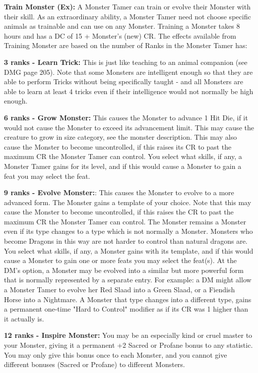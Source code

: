 \textbf{Train Monster (Ex):} A Monster Tamer can train or evolve their Monster with their  skill. As an extraordinary ability,
a Monster Tamer need not choose specific animals as trainable and can use  on any Monster. Training a Monster
takes 8 hours and has a DC of 15 + Monster's (new) CR. The effects available from Training Monster are based on the number of
Ranks in  the Monster Tamer has:

\begin{itemize*}
\item \textbf{3 ranks - Learn Trick:}  This is just like teaching to an animal companion (see DMG page 205). Note that some Monsters are intelligent enough so that they are able to perform Tricks without being specifically taught - and all Monsters are able to learn at least 4 tricks even if their intelligence would not normally be high enough.
\item \textbf{6 ranks - Grow Monster:} This causes the Monster to advance 1 Hit Die, if it would not cause the Monster to exceed its advancement limit. This may cause the creature to grow in size category, see the monster description. This may also cause the Monster to become uncontrolled, if this raises its CR to past the maximum CR the Monster Tamer can control. You select
what skills, if any, a Monster Tamer gains for its level, and if this would cause a Monster to gain a feat you may select the feat.
\item \textbf{9 ranks - Evolve Monster:}: This causes the Monster to evolve to a more advanced form. The Monster gains a template of your choice. Note that this may cause the Monster to become uncontrolled, if this raises the CR to past the maximum CR the Monster Tamer can control. The Monster remains a Monster even if its type changes to a type which is not normally a Monster. Monsters who become Dragons in this way are not harder to control than natural dragons are. You select what skills, if any, a Monster gains with its template, and if this would cause a Monster to gain one or more feats you may select the feat(s). At the DM's option, a Monster may be evolved into a similar but more powerful form that is normally represented by a separate entry. For example: a DM might allow a Monster Tamer to evolve her Red Slaad into a Green Slaad, or a Fiendish Horse into a Nightmare. A Monster that type changes into a different type, gains a permanent one-time "Hard to Control" modifier as if its CR was 1 higher than it actually is.
\item \textbf{12 ranks - Inspire Monster:} You may be an especially kind or cruel master to your Monster, giving it a permanent +2 Sacred or Profane bonus to any statistic. You may only give this bonus once to each Monster, and you cannot give different bonuses (Sacred or Profane) to different Monsters.
\end{itemize*}

